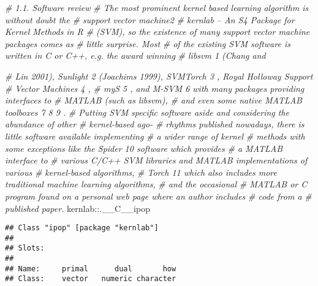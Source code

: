 \documentclass[
]{article}
\newenvironment{Shaded}{\begin{snugshade}}{\end{snugshade}}
\newcommand{\CommentTok}[1]{\textcolor[rgb]{0.56,0.35,0.01}{\textit{#1}}}
\newcommand{\NormalTok}[1]{#1}
\newcommand{\SpecialCharTok}[1]{\textcolor[rgb]{0.00,0.00,0.00}{#1}}
\begin{document}
\begin{Shaded}
\begin{Highlighting}[]
\CommentTok{\# 1.1. Software review}
\CommentTok{\# The most prominent kernel based learning algorithm is without doubt the }
\CommentTok{\# support vector machine2}
\CommentTok{\# kernlab – An S4 Package for Kernel Methods in R}
\CommentTok{\# (SVM), so the existence of many support vector machine packages comes as }
\CommentTok{\# little surprise. Most}
\CommentTok{\# of the existing SVM software is written in C or C++, e.g. the award winning }
\CommentTok{\# libsvm 1 (Chang and}
                                                                                      
\CommentTok{\# Lin 2001), Sunlight 2 (Joachims 1999), SVMTorch 3 , Royal Holloway Support }
\CommentTok{\# Vector Machines 4 ,}
\CommentTok{\# myS 5 , and M{-}SVM 6 with many packages providing interfaces to }
\CommentTok{\# MATLAB (such as libsvm),}
\CommentTok{\# and even some native MATLAB toolboxes 7 8 9 .}
\CommentTok{\# Putting SVM specific software aside and considering the abundance of other }
\CommentTok{\# kernel{-}based ago{-}}
\CommentTok{\#  rhythms published nowadays, there is little software available implementing }
\CommentTok{\# a wider range of kernel}
\CommentTok{\# methods with some exceptions like the Spider 10 software which provides }
\CommentTok{\# a MATLAB interface to}
\CommentTok{\# various C/C++ SVM libraries and MATLAB implementations of various }
\CommentTok{\# kernel{-}based algorithms,}
\CommentTok{\# Torch 11 which also includes more traditional machine learning algorithms, }
\CommentTok{\# and the occasional}
\CommentTok{\# MATLAB or C program found on a personal web page where an author includes }
\CommentTok{\# code from a}
\CommentTok{\# published paper.}
\NormalTok{kernlab}\SpecialCharTok{::}\NormalTok{.\_\_C\_\_ipop}
\end{Highlighting}
\end{Shaded}

\begin{verbatim}
## Class "ipop" [package "kernlab"]
## 
## Slots:
##                                     
## Name:     primal      dual       how
## Class:    vector   numeric character
\end{verbatim}
\end{document}
